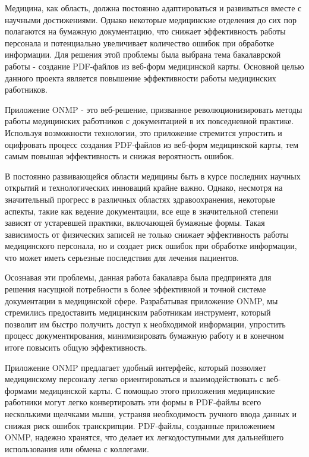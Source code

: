 \introduction %


Медицина, как область, должна постоянно адаптироваться и развиваться вместе с научными достижениями. Однако некоторые медицинские отделения до сих пор полагаются на бумажную документацию, что снижает эффективность работы персонала и потенциально увеличивает количество ошибок при обработке информации. Для решения этой проблемы была выбрана тема бакалаврской работы - создание PDF-файлов из веб-форм медицинской карты.  Основной целью данного проекта является повышение эффективности работы медицинских работников.

Приложение ONMP - это веб-решение, призванное революционизировать методы работы медицинских работников с документацией в их повседневной практике. Используя возможности технологии, это приложение стремится упростить и оцифровать процесс создания PDF-файлов из веб-форм медицинской карты, тем самым повышая эффективность и снижая вероятность ошибок.

В постоянно развивающейся области медицины быть в курсе последних научных открытий и технологических инноваций крайне важно. Однако, несмотря на значительный прогресс в различных областях здравоохранения, некоторые аспекты, такие как ведение документации, все еще в значительной степени зависят от устаревшей практики, включающей бумажные формы. Такая зависимость от физических записей не только снижает эффективность работы медицинского персонала, но и создает риск ошибок при обработке информации, что может иметь серьезные последствия для лечения пациентов.

Осознавая эти проблемы, данная работа бакалавра была предпринята для решения насущной потребности в более эффективной и точной системе документации в медицинской сфере. Разрабатывая приложение ONMP, мы стремились предоставить медицинским работникам инструмент, который позволит им быстро получить доступ к необходимой информации, упростить процесс документирования, минимизировать бумажную работу и в конечном итоге повысить общую эффективность.

Приложение ONMP предлагает удобный интерфейс, который позволяет медицинскому персоналу легко ориентироваться и взаимодействовать с веб-формами медицинской карты. С помощью этого приложения медицинские работники могут легко конвертировать эти формы в PDF-файлы всего несколькими щелчками мыши, устраняя необходимость ручного ввода данных и снижая риск ошибок транскрипции. PDF-файлы, созданные приложением ONMP, надежно хранятся, что делает их легкодоступными для дальнейшего использования или обмена с коллегами.

